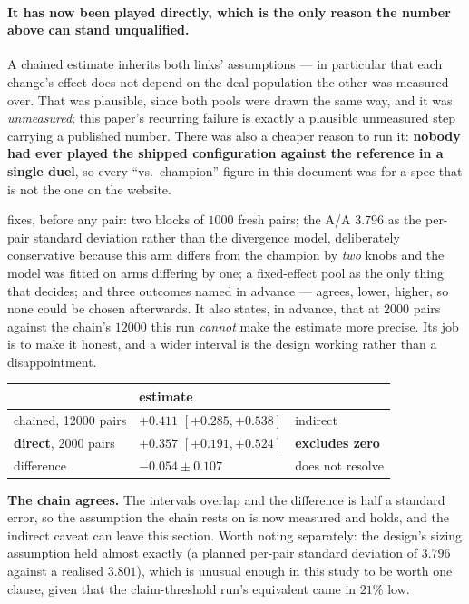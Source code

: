 \documentclass[11pt,letterpaper]{article}
\begin{document}
\paragraph{It has now been played directly, which is the only reason the
number above can stand unqualified.} A chained estimate inherits both links'
assumptions --- in particular that each change's effect does not depend on the
deal population the other was measured over. That was plausible, since both
pools were drawn the same way, and it was \emph{unmeasured}; this paper's
recurring failure is exactly a plausible unmeasured step carrying a published
number. There was also a cheaper reason to run it: \textbf{nobody had ever
played the shipped configuration against the reference in a single duel}, so
every ``vs.\ champion'' figure in this document was for a spec that is not the
one on the website.

 fixes, before any pair: two blocks
of $1000$ fresh pairs; the A/A $3.796$ as the per-pair standard deviation
rather than the divergence model, deliberately conservative because this arm
differs from the champion by \emph{two} knobs and the model was fitted on arms
differing by one; a fixed-effect pool as the only thing that decides; and three
outcomes named in advance --- agrees, lower, higher, so none could be chosen
afterwards. It also states, in advance, that at $2000$ pairs against the
chain's $12000$ this run \emph{cannot} make the estimate more precise. Its job
is to make it honest, and a wider interval is the design working rather than a
disappointment.

\begin{center}
\small
\begin{tabular}{lll}
\toprule
& estimate & \\
\midrule
chained, 12000 pairs & $+0.411$ $[+0.285, +0.538]$ & indirect \\
\textbf{direct}, 2000 pairs & $\mathbf{+0.357}$ $[+0.191, +0.524]$ & \textbf{excludes zero} \\
\midrule
difference & $-0.054 \pm 0.107$ & does not resolve \\
\bottomrule
\end{tabular}
\end{center}

\textbf{The chain agrees.} The intervals overlap and the difference is half a
standard error, so the assumption the chain rests on is now measured and holds,
and the indirect caveat can leave this section. Worth noting separately: the
design's sizing assumption held almost exactly (a planned per-pair standard
deviation of $3.796$ against a realised $3.801$), which is unusual enough in
this study to be worth one clause, given that the claim-threshold run's
equivalent came in $21\%$ low.
\end{document}

